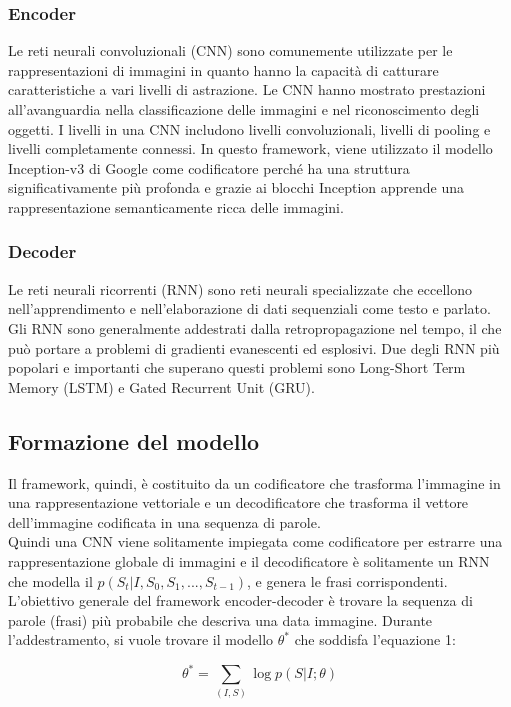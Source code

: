 \documentclass[12pt,a4paper]{report}
\begin{document}
\subsubsection{Encoder}
Le reti neurali convoluzionali (CNN) sono comunemente utilizzate per le rappresentazioni di immagini in quanto hanno la capacità di catturare caratteristiche a vari livelli di astrazione. Le CNN hanno mostrato prestazioni all'avanguardia nella classificazione delle immagini e nel riconoscimento degli oggetti. I livelli in una CNN includono livelli convoluzionali, livelli di pooling e livelli completamente connessi. 
In questo framework, viene utilizzato il modello Inception-v3 di Google come codificatore perché ha una struttura significativamente più profonda e grazie ai blocchi Inception apprende una rappresentazione semanticamente ricca delle immagini.

\subsubsection{Decoder}
Le reti neurali ricorrenti (RNN) sono reti neurali specializzate che eccellono nell'apprendimento e nell'elaborazione di dati sequenziali come testo e parlato. Gli RNN sono generalmente addestrati dalla retropropagazione nel tempo, il che può portare a problemi di gradienti evanescenti ed esplosivi. Due degli RNN più popolari e importanti che superano questi problemi sono Long-Short Term Memory (LSTM) e Gated Recurrent Unit (GRU).

\subsection{Formazione del modello}
Il framework, quindi, è costituito da un codificatore che trasforma l'immagine in una rappresentazione vettoriale e un decodificatore che trasforma il vettore dell'immagine codificata in una sequenza di parole.\\
Quindi una CNN viene solitamente impiegata come codificatore per estrarre una rappresentazione globale di immagini e il decodificatore è solitamente un RNN che modella il $p(S_t|I, S_0, S_1, . . . ,S_{t-1})$, e genera le frasi corrispondenti.\\
L'obiettivo generale del framework encoder-decoder è trovare la sequenza di parole (frasi) più probabile che descriva una data immagine. Durante l'addestramento, si vuole trovare il modello $\theta^*$ che soddisfa l’equazione 1:

\begin{equation}
{\displaystyle \theta^* =  \sum\limits_{(I, S)} \log p(S | I; \theta)}
\end{equation}
\end{document}
